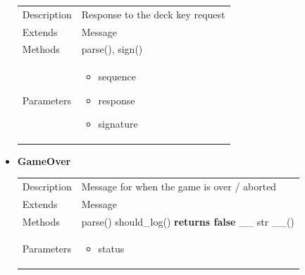 \documentclass[11pt]{article}
\begin{document}
\begin{itemize}
	
  \begin{longtable}[]{@{}ll@{}}
  \toprule
  \endhead
  \begin{minipage}[t]{0.40\columnwidth}\raggedright
  Description\strut
  \end{minipage} & \begin{minipage}[t]{0.54\columnwidth}\raggedright
  Response to the deck key request \strut
  \end{minipage}\tabularnewline
  \begin{minipage}[t]{0.40\columnwidth}\raggedright
  Extends\strut
  \end{minipage} & \begin{minipage}[t]{0.54\columnwidth}\raggedright
  Message\strut
  \end{minipage}\tabularnewline
  \begin{minipage}[t]{0.40\columnwidth}\raggedright
  Methods\strut
  \end{minipage} & \begin{minipage}[t]{0.54\columnwidth}\raggedright
  parse(), sign()\strut
  \end{minipage}\tabularnewline
  \begin{minipage}[t]{0.40\columnwidth}\raggedright
  Parameters\strut
  \end{minipage} & \begin{minipage}[t]{0.54\columnwidth}\raggedright
  \begin{itemize}
  	\item sequence
  	\item response
  	\item signature
  \end{itemize}
  \end{minipage}\tabularnewline
  \bottomrule
  \end{longtable}
	
\item
  \textbf{GameOver}

  \begin{longtable}[]{@{}ll@{}}
  \toprule
  \endhead
  Description & Message for when the game is over /
  aborted\tabularnewline
  Extends & Message\tabularnewline
  Methods & parse() should\_log() \textbf{returns false} \_\_ str
  \_\_()\tabularnewline
  \begin{minipage}[t]{0.40\columnwidth}\raggedright
  Parameters\strut
  \end{minipage} & \begin{minipage}[t]{0.54\columnwidth}\raggedright
  \begin{itemize}
  	\item status
  \end{itemize}\strut
  \end{minipage}\tabularnewline
  \bottomrule
  \end{longtable}

\end{itemize}
\end{document}
